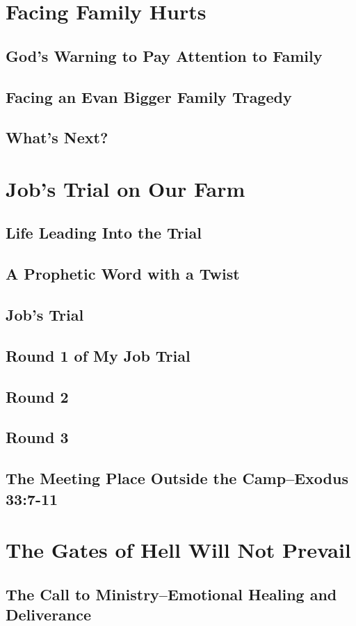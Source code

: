 \documentclass[oneside]{book}
\begin{document}
\chapter{Facing Family Hurts}
\section{God's Warning to Pay Attention to Family}
\section{Facing an Evan Bigger Family Tragedy}
\section{What's Next?}
\chapter{Job's Trial on Our Farm}
\section{Life Leading Into the Trial}
\section{A Prophetic Word with a Twist}
\section{Job's Trial}
\section{Round 1 of My Job Trial}
\section{Round 2}
\section{Round 3}
\section{The Meeting Place Outside the Camp--Exodus 33:7-11}
\chapter{The Gates of Hell Will Not Prevail}
\section{The Call to Ministry--Emotional Healing and Deliverance}
\end{document}
